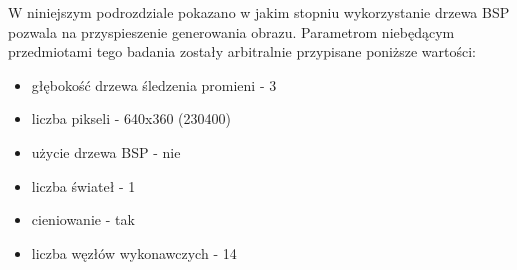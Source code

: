 W niniejszym podrozdziale pokazano w jakim stopniu wykorzystanie drzewa BSP pozwala na przyspieszenie generowania obrazu.
Parametrom niebędącym przedmiotami tego badania zostały arbitralnie przypisane poniższe wartości:

\begin{itemize}

\item głębokość drzewa śledzenia promieni - 3
\item liczba pikseli - 640x360 (230400)
\item użycie drzewa BSP - nie
\item liczba świateł - 1
\item cieniowanie - tak
\item liczba węzłów wykonawczych - 14 

\end{itemize}



